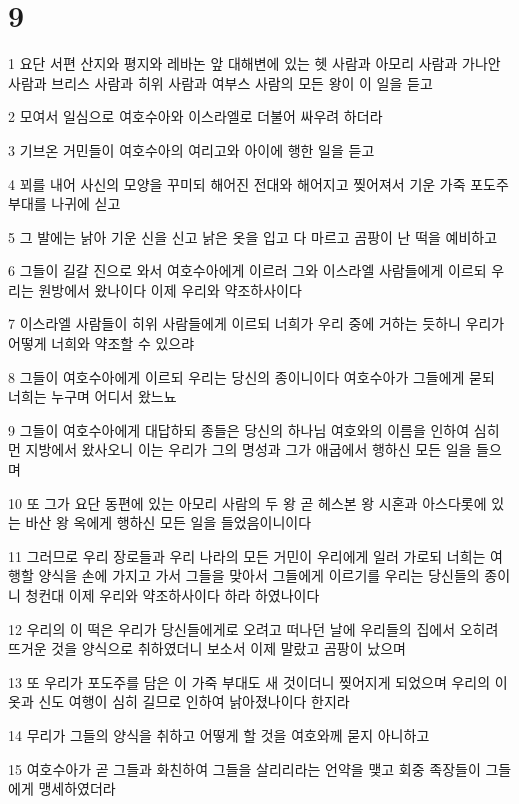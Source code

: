 \chapter{9}

\par 1 요단 서편 산지와 평지와 레바논 앞 대해변에 있는 헷 사람과 아모리 사람과 가나안 사람과 브리스 사람과 히위 사람과 여부스 사람의 모든 왕이 이 일을 듣고
\par 2 모여서 일심으로 여호수아와 이스라엘로 더불어 싸우려 하더라
\par 3 기브온 거민들이 여호수아의 여리고와 아이에 행한 일을 듣고
\par 4 꾀를 내어 사신의 모양을 꾸미되 해어진 전대와 해어지고 찢어져서 기운 가죽 포도주 부대를 나귀에 싣고
\par 5 그 발에는 낡아 기운 신을 신고 낡은 옷을 입고 다 마르고 곰팡이 난 떡을 예비하고
\par 6 그들이 길갈 진으로 와서 여호수아에게 이르러 그와 이스라엘 사람들에게 이르되 우리는 원방에서 왔나이다 이제 우리와 약조하사이다
\par 7 이스라엘 사람들이 히위 사람들에게 이르되 너희가 우리 중에 거하는 듯하니 우리가 어떻게 너희와 약조할 수 있으랴
\par 8 그들이 여호수아에게 이르되 우리는 당신의 종이니이다 여호수아가 그들에게 묻되 너희는 누구며 어디서 왔느뇨
\par 9 그들이 여호수아에게 대답하되 종들은 당신의 하나님 여호와의 이름을 인하여 심히 먼 지방에서 왔사오니 이는 우리가 그의 명성과 그가 애굽에서 행하신 모든 일을 들으며
\par 10 또 그가 요단 동편에 있는 아모리 사람의 두 왕 곧 헤스본 왕 시혼과 아스다롯에 있는 바산 왕 옥에게 행하신 모든 일을 들었음이니이다
\par 11 그러므로 우리 장로들과 우리 나라의 모든 거민이 우리에게 일러 가로되 너희는 여행할 양식을 손에 가지고 가서 그들을 맞아서 그들에게 이르기를 우리는 당신들의 종이니 청컨대 이제 우리와 약조하사이다 하라 하였나이다
\par 12 우리의 이 떡은 우리가 당신들에게로 오려고 떠나던 날에 우리들의 집에서 오히려 뜨거운 것을 양식으로 취하였더니 보소서 이제 말랐고 곰팡이 났으며
\par 13 또 우리가 포도주를 담은 이 가죽 부대도 새 것이더니 찢어지게 되었으며 우리의 이 옷과 신도 여행이 심히 길므로 인하여 낡아졌나이다 한지라
\par 14 무리가 그들의 양식을 취하고 어떻게 할 것을 여호와께 묻지 아니하고
\par 15 여호수아가 곧 그들과 화친하여 그들을 살리리라는 언약을 맺고 회중 족장들이 그들에게 맹세하였더라
